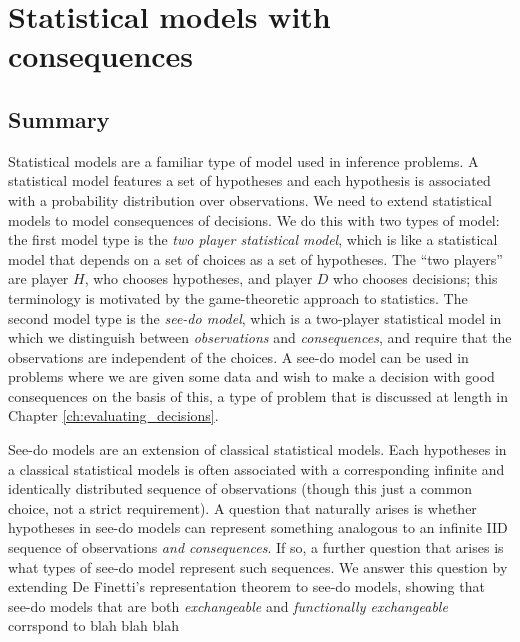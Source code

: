 

\chapter{Statistical models with consequences}\label{ch:2p_statmodels}


\section{Summary}

Statistical models are a familiar type of model used in inference problems. A statistical model features a set of hypotheses and each hypothesis is associated with a probability distribution over observations. We need to extend statistical models to model consequences of decisions. We do this with two types of model: the first model type is the \emph{two player statistical model}, which is like a statistical model that depends on a set of choices as a set of hypotheses. The ``two players'' are player $H$, who chooses hypotheses, and player $D$ who chooses decisions; this terminology is motivated by the game-theoretic approach to statistics. The second model type is the \emph{see-do model}, which is a two-player statistical model in which we distinguish between \emph{observations} and \emph{consequences}, and require that the observations are independent of the choices. A see-do model can be used in problems where we are given some data and wish to make a decision with good consequences on the basis of this, a type of problem that is discussed at length in Chapter \ref{ch:evaluating_decisions}.

See-do models are an extension of classical statistical models. Each hypotheses in a classical statistical models is often associated with a corresponding infinite and identically distributed sequence of observations (though this just a common choice, not a strict requirement). A question that naturally arises is whether hypotheses in see-do models can represent something analogous to an infinite IID sequence of observations \emph{and consequences}. If so, a further question that arises is what types of see-do model represent such sequences. We answer this question by extending De Finetti's representation theorem to see-do models, showing that see-do models that are both \emph{exchangeable} and \emph{functionally exchangeable} corrspond to blah blah blah



